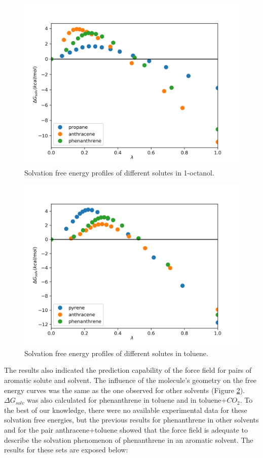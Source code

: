 \begin{figure}[H]
    \centering
    \includegraphics[width=0.9\linewidth]{Figures/oct}
    \caption{Solvation free energy profiles of different solutes in 1-octanol.}
    \label{fig:oct}
\end{figure}

\begin{figure}[H]
    \centering
    \includegraphics[width=0.9\linewidth]{Figures/tol}
    \caption{Solvation free energy profiles of different solutes in toluene. }
    \label{fig:tol}
\end{figure}

 The results also indicated the prediction capability of the force field for pairs of aromatic solute and solvent. The influence of the molecule's geometry on the free energy curves was the same as the one observed for other solvents (Figure \ref{fig:tol}). $\Delta G_{solv}$ was also calculated for phenanthrene in toluene and in toluene+$CO_{2}$. To the best of our knowledge, there were no available experimental data for these solvation free energies, but the previous results for phenanthrene in other solvents and for the pair anthracene+toluene showed that the force field is adequate to describe the solvation phenomenon of phenanthrene in an aromatic solvent. The results for these sets are exposed below: 
 
